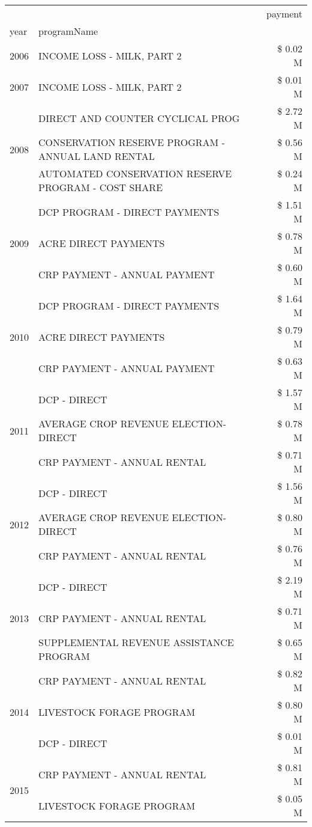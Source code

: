 \begin{tabular}{llr}
\toprule
 &  & payment \\
year & programName &  \\
\midrule
2006 & INCOME LOSS - MILK, PART 2 & \$ 0.02 M \\
\cline{1-3}
2007 & INCOME LOSS - MILK, PART 2 & \$ 0.01 M \\
\cline{1-3}
\multirow[t]{3}{*}{2008} & DIRECT AND COUNTER CYCLICAL PROG & \$ 2.72 M \\
 & CONSERVATION RESERVE PROGRAM - ANNUAL LAND RENTAL & \$ 0.56 M \\
 & AUTOMATED CONSERVATION RESERVE PROGRAM - COST SHARE & \$ 0.24 M \\
\cline{1-3}
\multirow[t]{3}{*}{2009} & DCP PROGRAM - DIRECT PAYMENTS & \$ 1.51 M \\
 & ACRE DIRECT PAYMENTS & \$ 0.78 M \\
 & CRP PAYMENT - ANNUAL PAYMENT & \$ 0.60 M \\
\cline{1-3}
\multirow[t]{3}{*}{2010} & DCP PROGRAM - DIRECT PAYMENTS & \$ 1.64 M \\
 & ACRE DIRECT PAYMENTS & \$ 0.79 M \\
 & CRP PAYMENT - ANNUAL PAYMENT & \$ 0.63 M \\
\cline{1-3}
\multirow[t]{3}{*}{2011} & DCP - DIRECT & \$ 1.57 M \\
 & AVERAGE CROP REVENUE ELECTION-DIRECT & \$ 0.78 M \\
 & CRP PAYMENT - ANNUAL RENTAL & \$ 0.71 M \\
\cline{1-3}
\multirow[t]{3}{*}{2012} & DCP - DIRECT & \$ 1.56 M \\
 & AVERAGE CROP REVENUE ELECTION-DIRECT & \$ 0.80 M \\
 & CRP PAYMENT - ANNUAL RENTAL & \$ 0.76 M \\
\cline{1-3}
\multirow[t]{3}{*}{2013} & DCP - DIRECT & \$ 2.19 M \\
 & CRP PAYMENT - ANNUAL RENTAL & \$ 0.71 M \\
 & SUPPLEMENTAL REVENUE ASSISTANCE PROGRAM & \$ 0.65 M \\
\cline{1-3}
\multirow[t]{3}{*}{2014} & CRP PAYMENT - ANNUAL RENTAL & \$ 0.82 M \\
 & LIVESTOCK FORAGE PROGRAM & \$ 0.80 M \\
 & DCP - DIRECT & \$ 0.01 M \\
\cline{1-3}
\multirow[t]{3}{*}{2015} & CRP PAYMENT - ANNUAL RENTAL & \$ 0.81 M \\
 & LIVESTOCK FORAGE PROGRAM & \$ 0.05 M \\

\end{tabular}

